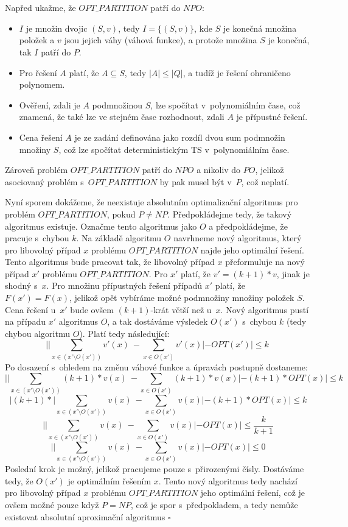 \documentclass[a4paper]{article}
\newcommand{\prt}{OPT\_PARTITION}
\begin{document}
\pagebreak

\section*{}
Napřed ukažme, že $\prt$ patří do $NPO$:
\begin{itemize}
 \item $I$ je množin dvojic $(S,v)$, tedy $I=\{(S,v)\}$, kde $S$ je konečná množina položek a $v$ jsou jejich váhy (váhová funkce), a protože
  množina $S$ je konečná, tak $I$ patří do $P$.
 \item Pro řešení $A$ platí, že $A\subseteq S$, tedy $|A|\leq |Q|$, a tudíž je řešení ohraničeno polynomem.
 \item Ověření, zdali je $A$ podmnožinou $S$, lze spočítat v~polynomiálním čase, což znamená, že také lze ve stejném čase rozhodnout, zdali $A$ je přípustné řešení.
 \item Cena řešení $A$ je ze zadání definována jako rozdíl dvou sum podmnožin množiny $S$,
 což lze spočítat deterministickým TS v~polynomiálním čase.
\end{itemize}
 Zároveň problém $\prt$ patří do $NPO$ a nikoliv do $PO$, jelikož asociovaný problém s~$\prt$ by pak musel být v~$P$, což neplatí.

 Nyní sporem dokážeme, že neexistuje absolutním optimalizační algoritmus pro problém $\prt$, pokud $P \neq NP$.
 Předpokládejme tedy, že takový algoritmus existuje.
 Označme tento algoritmus jako $O$ a předpokládejme, že pracuje s~chybou $k$.
 Na základě algoritmu $O$ navrhneme nový algoritmus, který pro libovolný případ $x$ problému $\prt$ najde jeho optimální řešení.
 Tento algoritmus bude pracovat tak, že libovolný případ $x$ přeformuluje na nový případ $x'$ problému $\prt$.
 Pro $x'$ platí, že $v'=(k+1)*v$, jinak je shodný s~$x$.
 Pro množinu přípustných řešení případů $x'$ platí, že $F(x')=F(x)$, jelikož opět vybíráme možné podmnožiny množiny položek $S$.
 Cena řešení u~$x'$ bude ovšem $(k+1)$-krát větší než u~$x$.
 Nový algoritmus pustí na případu $x'$ algoritmus $O$, a tak dostáváme výsledek $O(x')$ s~chybou $k$ (tedy chybou algoritmu $O$).
 Platí tedy následující:
 $$ ||\sum_{x\in (x'\setminus O(x'))} v'(x)\ - \sum_{x\in O(x')} v'(x)| - OPT(x')| \leq k~$$
 Po dosazení s~ohledem na změnu váhové funkce a úpravách postupně dostaneme:
 $$ ||\sum_{x\in (x'\setminus O(x'))} (k+1)*v(x)\ - \sum_{x\in O(x')} (k+1)*v(x)| - (k+1)*OPT(x)| \leq k$$
 $$ |(k+1)*|\sum_{x\in (x'\setminus O(x'))} v(x)\ - \sum_{x\in O(x')} v(x)| - (k+1)*OPT(x)| \leq k$$
 $$ ||\sum_{x\in (x'\setminus O(x'))} v(x)\ - \sum_{x\in O(x')} v(x)| - OPT(x)| \leq \frac{k}{k+1}$$
 $$ ||\sum_{x\in (x'\setminus O(x'))} v(x)\ - \sum_{x\in O(x')} v(x)| - OPT(x)| \leq 0$$
 Poslední krok je možný, jelikož pracujeme pouze s~přirozenými čísly.
 Dostáváme tedy, že $O(x')$ je optimálním řešením $x$.
 Tento nový algoritmus tedy nachází pro libovolný případ $x$ problému $\prt$ jeho optimální řešení,
 což je ovšem možné pouze když $P=NP$, což je spor s~předpokladem,
 a tedy nemůže existovat absolutní aproximační algoritmus $\square$
\end{document}
